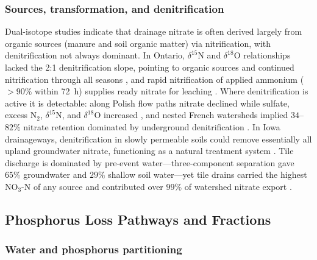 \subsubsection{Sources, transformation, and denitrification}

Dual-isotope studies indicate that drainage nitrate is often derived largely
from organic sources (manure and soil organic matter) via nitrification,
with denitrification not always dominant. In Ontario, $\delta^{15}$N and
$\delta^{18}$O relationships lacked the 2:1 denitrification slope, pointing
to organic sources and continued nitrification through all seasons
\parencite{Smith2011,Smith2011b}, and rapid nitrification of applied
ammonium ($>90\%$ within 72~h) supplies ready nitrate for leaching
\parencite{Hu2024}. Where denitrification is active it is detectable:
along Polish flow paths nitrate declined while sulfate, excess N$_2$,
$\delta^{15}$N, and $\delta^{18}$O increased \parencite{Dragon2016}, and
nested French watersheds implied $34$--$82\%$ nitrate retention dominated by
underground denitrification \parencite{Billy2011,Billy2013}. In Iowa
drainageways, denitrification in slowly permeable soils could remove
essentially all upland groundwater nitrate, functioning as a natural
treatment system \parencite{Schilling2007,Cambardella1999}. Tile discharge
is dominated by pre-event water---three-component separation gave $65\%$
groundwater and $29\%$ shallow soil water---yet tile drains carried the
highest NO$_3$-N of any source and contributed over $99\%$ of watershed
nitrate export \parencite{Williams2022,Grose2022}.

\subsection{Phosphorus Loss Pathways and Fractions}

\subsubsection{Water and phosphorus partitioning}

